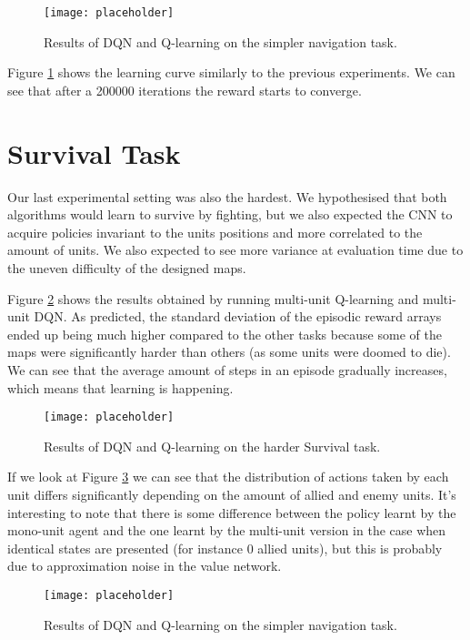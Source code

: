 \begin{figure}[h]
    \centering
    \texttt{[image: placeholder]}
    \caption{Results of DQN and Q-learning on the simpler navigation task.}
    \label{fig:guid_task_results}
\end{figure}

Figure \ref{fig:guid_task_results} shows the learning curve similarly to the
previous experiments. We can see that after a 200000 iterations the reward
starts to converge. 

\section{Survival Task}

Our last experimental setting was also the hardest. We hypothesised that both
algorithms would learn to survive by fighting, but we also expected the CNN to
acquire policies invariant to the units positions and more correlated to the
amount of units. We also expected to see more variance at evaluation time due to
the uneven difficulty of the designed maps.


Figure \ref{fig:surv_task_results} shows the results obtained by running
multi-unit Q-learning and multi-unit DQN. As predicted, the standard deviation
of the episodic reward arrays ended up being much higher compared to the other
tasks because some of the maps were significantly harder than others (as some
units were doomed to die). We can see that the average amount of steps in an
episode gradually increases, which means that learning is happening.

\begin{figure}[h]
    \centering
    \texttt{[image: placeholder]}
    \caption{Results of DQN and Q-learning on the harder Survival task.}
    \label{fig:surv_task_results}
\end{figure}

If we look at Figure \ref{fig:dif_pol} we can see that the distribution of
actions taken by each unit differs significantly depending on the amount of
allied and enemy units. It's interesting to note that there is some difference
between the policy learnt by the mono-unit agent and the one learnt by the
multi-unit version in the case when identical states are presented (for instance
0 allied units), but this is probably due to approximation noise in the
value network.

\begin{figure}[h]
    \centering
    \texttt{[image: placeholder]}
    \caption{Results of DQN and Q-learning on the simpler navigation task.}
    \label{fig:dif_pol}
\end{figure}



